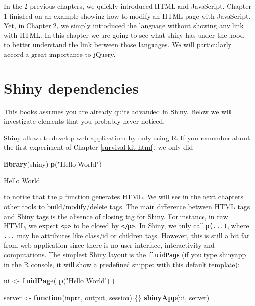 \documentclass[]{book}
\newenvironment{Shaded}{\begin{snugshade}}{\end{snugshade}}
\newcommand{\ControlFlowTok}[1]{\textcolor[rgb]{0.13,0.29,0.53}{\textbf{#1}}}
\newcommand{\KeywordTok}[1]{\textcolor[rgb]{0.13,0.29,0.53}{\textbf{#1}}}
\newcommand{\NormalTok}[1]{#1}
\newcommand{\StringTok}[1]{\textcolor[rgb]{0.31,0.60,0.02}{#1}}
\begin{document}
In the 2 previous chapters, we quickly introduced HTML and JavaScript. Chapter 1 finished on an example showing how to modify an HTML page with JavaScript. Yet, in Chapter 2, we simply introduced the language without showing any link with HTML.
In this chapter we are going to see what shiny has under the hood to better understand the link between those languages. We will particularly accord a great importance to jQuery.

\hypertarget{shiny-dependencies}{%
\section{Shiny dependencies}\label{shiny-dependencies}}

This books assumes you are already quite advanded in Shiny. Below we will investigate elements that you probably never noticed.

Shiny allows to develop web applications by only using R. If you remember about the first experiment of Chapter \ref{survival-kit-html}, we only did

\begin{Shaded}
\begin{Highlighting}[]
\KeywordTok{library}\NormalTok{(shiny)}
\KeywordTok{p}\NormalTok{(}\StringTok{"Hello World"}\NormalTok{)}
\end{Highlighting}
\end{Shaded}

Hello World

to notice that the \texttt{p} function generates HTML. We will see in the next chapters other tools to build/modify/delete tags. The main difference between HTML tags and Shiny tags is the absence of closing tag for Shiny. For instance, in raw HTML, we expect \texttt{\textless{}p\textgreater{}} to be closed by \texttt{\textless{}/p\textgreater{}}. In Shiny, we only call \texttt{p(...)}, where \texttt{...} may be attributes like class/id or children tags. However, this is still a bit far from web application since there is no user interface, interactivity and computations. The simplest Shiny layout is the \texttt{fluidPage} (if you type shinyapp in the R console, it will show a predefined snippet with this default template):

\begin{Shaded}
\begin{Highlighting}[]
\NormalTok{ui <-}\StringTok{ }\KeywordTok{fluidPage}\NormalTok{(}
  \KeywordTok{p}\NormalTok{(}\StringTok{"Hello World"}\NormalTok{)}
\NormalTok{)}

\NormalTok{server <-}\StringTok{ }\ControlFlowTok{function}\NormalTok{(input, output, session) \{\}}
\KeywordTok{shinyApp}\NormalTok{(ui, server)}
\end{Highlighting}
\end{Shaded}
\end{document}
